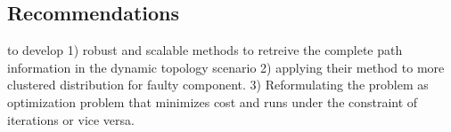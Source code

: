 \documentclass[10pt]{sigplan-proc-varsize}
\begin{document}
\subsection{Recommendations}
\cite{krishna:12} to develop 1) robust and scalable methods to retreive the complete path information in the dynamic topology scenario 2) applying their method to more clustered distribution for faulty component. 3) Reformulating the problem as optimization problem that minimizes cost and runs under the constraint of iterations or vice versa.

\appendix
%
%


\end{document}
